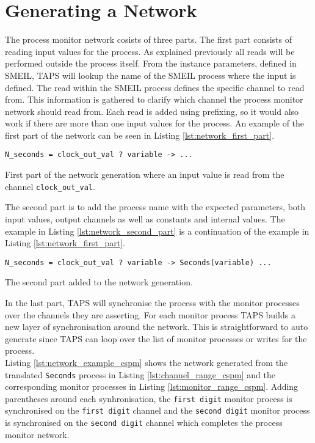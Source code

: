 \section{Generating a \cspm{} Network}
The process monitor network cosists of three parts. The first part consists of reading input values for the process. As explained previously all reads will be performed outside the process itself. From the instance parameters, defined in SMEIL, TAPS will lookup the name of the SMEIL process where the input is defined. The read within the SMEIL process defines the specific channel to read from. This information is gathered to clarify which \cspm{} channel the process monitor network should read from. Each read is added using prefixing, so it would also work if there are more than one input values for the process. An example of the first part of the network can be seen in Listing \ref{lst:network_first_part}.
\begin{listing}
\begin{verbatim}
N_seconds = clock_out_val ? variable -> ...
\end{verbatim}
\caption{First part of the network generation where an input value is read from the channel \texttt{clock\_out\_val}.}
\label{lst:network_first_part}
\end{listing}
The second part is to add the process name with the expected parameters, both input values, output channels as well as constants and internal values. The example in Listing \ref{lst:network_second_part} is a continuation of the example in Listing \ref{lst:network_first_part}.
\begin{listing}
\begin{verbatim}
N_seconds = clock_out_val ? variable -> Seconds(variable) ...
\end{verbatim}
\caption{The second part added to the network generation.}
\label{lst:network_second_part}
\end{listing}

In the last part, TAPS will synchronise the process with the monitor processes  over the channels they are asserting.
For each monitor process TAPS builds a new layer of synchronisation around the network. This is straightforward to auto generate since TAPS can loop over the list of monitor processes or writes for the process. \\

Listing \ref{lst:network_example_cspm} shows the network generated from the translated \texttt{Seconds} process in Listing \ref{lst:channel_range_cspm} and the corresponding monitor processes in Listing \ref{lst:monitor_range_cspm}. Adding parentheses around each synhronisation, the \texttt{first digit} monitor process is synchronised on the \texttt{first digit} channel and the \texttt{second digit} monitor process is synchronised on the \texttt{second digit} channel which completes the process monitor network.

